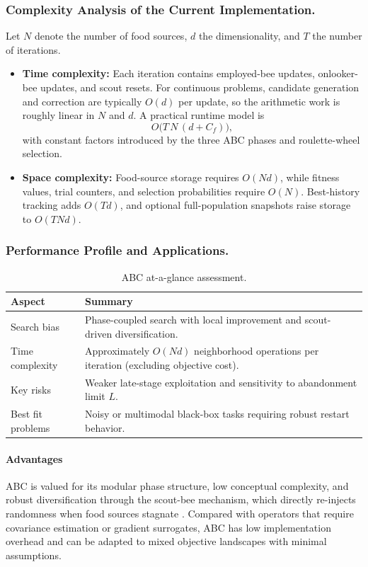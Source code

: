 \subsubsection{Complexity Analysis of the Current Implementation.}
Let $N$ denote the number of food sources, $d$ the dimensionality, and $T$ the number of iterations.
\begin{itemize}
  \item \textbf{Time complexity:} Each iteration contains employed-bee updates, onlooker-bee updates, and scout resets. For continuous problems, candidate generation and correction are typically $O(d)$ per update, so the arithmetic work is roughly linear in $N$ and $d$. A practical runtime model is
  $$
  O\big(T\,N\,(d + C_f)\big),
  $$
  with constant factors introduced by the three ABC phases and roulette-wheel selection.
  \item \textbf{Space complexity:} Food-source storage requires $O(Nd)$, while fitness values, trial counters, and selection probabilities require $O(N)$. Best-history tracking adds $O(Td)$, and optional full-population snapshots raise storage to $O(TNd)$.
\end{itemize}

\subsubsection{Performance Profile and Applications.}

\begin{table}[H]
\centering
\caption{ABC at-a-glance assessment.}
\label{tab:abc-profile}
\begin{tabular}{p{3.2cm} p{9.3cm}}
\hline
\textbf{Aspect} & \textbf{Summary} \\
\hline
Search bias & Phase-coupled search with local improvement and scout-driven diversification. \\
Time complexity & Approximately $O(Nd)$ neighborhood operations per iteration (excluding objective cost). \\
Key risks & Weaker late-stage exploitation and sensitivity to abandonment limit $L$. \\
Best fit problems & Noisy or multimodal black-box tasks requiring robust restart behavior. \\
\hline
\end{tabular}
\end{table}

\paragraph{Advantages}
ABC is valued for its modular phase structure, low conceptual complexity, and robust diversification through the scout-bee mechanism, which directly re-injects randomness when food sources stagnate \autocite{Karaboga2007}. Compared with operators that require covariance estimation or gradient surrogates, ABC has low implementation overhead and can be adapted to mixed objective landscapes with minimal assumptions.

